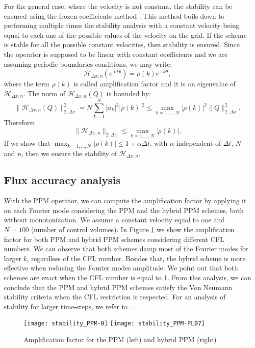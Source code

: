 For the general case, where the velocity is not constant, the stability
can be ensured using the frozen coefficients method \citep[p.~59]{strikwerda:2004}.
This method boils down to performing multiple times the stability analysis with a constant velocity
being equal to each one of the possible values of the velocity on the grid.
If the scheme is stable for all the possible constant velocities, then stability is ensured.
Since the operator is supposed to be linear with constant coefficients and we
are assuming periodic boundaries conditions, we may write:
\begin{equation*}
	\mathcal{H}_{\Delta x,n}(e^{\imath k \theta}) = \rho(k)  e^{\imath k \theta},
\end{equation*}
where the term $\rho(k)$ is called amplification factor and it is an eigenvalue of $\mathcal{H}_{\Delta x,n}$.
The norm of $\mathcal{H}_{\Delta x,n}(Q)$ is bounded by:
\begin{equation*}
	\|\mathcal{H}_{\Delta x,n}(Q)\|_{2,\Delta x}^2 = N \sum_{k=1}^{N} |a_k|^2 |\rho(k)|^2 \leq 
	\max_{k=1, \ldots, N}{|\rho(k)|}^2 \|Q\|_{2,\Delta x}^2.
\end{equation*}
Therefore:
\begin{equation*}
	\|\mathcal{H}_{\Delta x,n}\|_{2,\Delta x} \leq \max_{k=1, \ldots, N}{|\rho(k)|}.
\end{equation*}
If we show that $\max_{k=1, \ldots, N}{|\rho(k)|} \leq 1 + \alpha \Delta t$, 
with $\alpha$ independent of $\Delta t$, $N$ and $n$, then we ensure the stability of $\mathcal{H}_{\Delta x,n}$.

\subsection{Flux accuracy analysis}
\label{chp2-sub-flux}
With the PPM operator, we can compute the amplification factor by applying it
on each Fourier mode considering the PPM and the hybrid PPM schemes, both without monotonization.
We assume a constant velocity equal to one and $N=100$ (number of control volumes).
In Figure \ref{chp2-fig-amplification} we show the amplification factor for both PPM and hybrid PPM schemes
considering different CFL numbers.
We can observe that both schemes damp most of the Fourier modes for larger $k$, regardless of the CFL number.
Besides that, the hybrid scheme is more effective when reducing the Fourier modes amplitude.
We point out that both schemes are exact when the CFL number is equal to 1.
From this analysis, we can conclude that the PPM and hybrid PPM schemes satisfy the
Von Neumann stability criteria when the CFL restriction is respected.
For an analysis of stability for larger time-steps, we refer to \citet{lauritzen:2007}.
\begin{figure}[ht]
	\centering
	\texttt{[image: stability\_PPM-0]}
	\texttt{[image: stability\_PPM-PL07]}
	\caption{Amplification factor for the PPM (left) and hybrid PPM (right) schemes for different CFL numbers.}
	\label{chp2-fig-amplification}
\end{figure}


